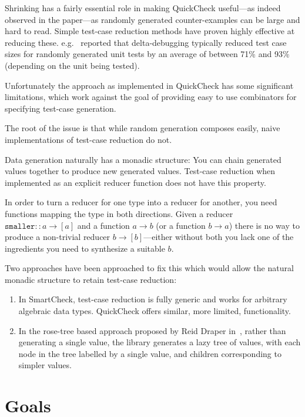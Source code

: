 Shrinking has a fairly essential role in making QuickCheck useful---as indeed observed in the paper---as randomly generated counter-examples can be large and hard to read.
Simple test-case reduction methods have proven highly effective at reducing these.
e.g.~ \cite{DBLP:conf/issre/LeiA05} reported that delta-debugging typically reduced test case sizes for randomly generated unit tests by an average of between 71\% and 93\% (depending on the unit being tested). 

Unfortunately the approach as implemented in QuickCheck has some significant limitations,
which work against the goal of providing easy to use combinators for specifying test-case generation.

The root of the issue is that while random generation composes easily,
naive implementations of test-case reduction do not.

Data generation naturally has a monadic structure:
You can chain generated values together to produce new generated values.
Test-case reduction when implemented as an explicit reducer function does not have this property.

In order to turn a reducer for one type into a reducer for another,
you need functions mapping the type in both directions.
Given a reducer \(\texttt{smaller} :: a \to [a]\) and a function \(a \to b\) (or a function \(b \to a\)) there is no way to produce a non-trivial reducer \(b \to [b]\)---either
without both you lack one of the ingredients you need to synthesize a suitable \(b\).

Two approaches have been approached to fix this which would allow the natural monadic structure to retain test-case reduction:

\begin{enumerate}
\item In SmartCheck\cite{DBLP:conf/haskell/Pike14},
test-case reduction is fully generic and works for arbitrary algebraic data types.
QuickCheck offers similar,
more limited,
functionality.
\item In the rose-tree based approach proposed by Reid Draper in~\cite{FreeShrinking},
rather than generating a single value,
the library generates a lazy tree of values,
with each node in the tree labelled by a single value,
and children corresponding to simpler values.
\end{enumerate}

\chapter{Goals}

